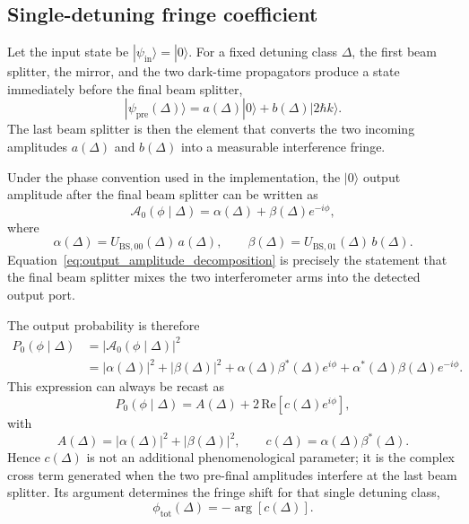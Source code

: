 \documentclass[11pt]{article}
\begin{document}
\subsection{Single-detuning fringe coefficient}
Let the input state be $|\psi_{\mathrm{in}}\rangle=|0\rangle$. For a fixed detuning class $\Delta$, the first beam splitter, the mirror, and the two dark-time propagators produce a state immediately before the final beam splitter,
\begin{equation}
|\psi_{\mathrm{pre}}(\Delta)\rangle
=
a(\Delta)|0\rangle+b(\Delta)|2\hbar k\rangle.
\label{eq:pre_final_state}
\end{equation}
The last beam splitter is then the element that converts the two incoming amplitudes $a(\Delta)$ and $b(\Delta)$ into a measurable interference fringe.

Under the phase convention used in the implementation, the $|0\rangle$ output amplitude after the final beam splitter can be written as
\begin{equation}
\mathcal{A}_0(\phi\mid\Delta)
=
\alpha(\Delta)+\beta(\Delta)e^{-i\phi},
\label{eq:output_amplitude_decomposition}
\end{equation}
where
\begin{equation}
\alpha(\Delta)=U_{\mathrm{BS},00}(\Delta)\,a(\Delta),
\qquad
\beta(\Delta)=U_{\mathrm{BS},01}(\Delta)\,b(\Delta).
\label{eq:alpha_beta_def}
\end{equation}
Equation~\eqref{eq:output_amplitude_decomposition} is precisely the statement that the final beam splitter mixes the two interferometer arms into the detected output port.

The output probability is therefore
\begin{align}
P_0(\phi\mid\Delta)
&=
\left|\mathcal{A}_0(\phi\mid\Delta)\right|^2 \\
&=
\left|\alpha(\Delta)\right|^2
+
\left|\beta(\Delta)\right|^2
+
\alpha(\Delta)\beta^*(\Delta)e^{i\phi}
+
\alpha^*(\Delta)\beta(\Delta)e^{-i\phi}.
\label{eq:expanded_output_probability}
\end{align}
This expression can always be recast as
\begin{equation}
P_0(\phi\mid\Delta)=A(\Delta)+2\,\mathrm{Re}\!\left[c(\Delta)e^{i\phi}\right],
\label{eq:single_detuning_fringe}
\end{equation}
with
\begin{equation}
A(\Delta)=\left|\alpha(\Delta)\right|^2+\left|\beta(\Delta)\right|^2,
\qquad
c(\Delta)=\alpha(\Delta)\beta^*(\Delta).
\label{eq:single_c_definition}
\end{equation}
Hence $c(\Delta)$ is not an additional phenomenological parameter; it is the complex cross term generated when the two pre-final amplitudes interfere at the last beam splitter. Its argument determines the fringe shift for that single detuning class,
\begin{equation}
\phi_{\mathrm{tot}}(\Delta)=-\arg\!\left[c(\Delta)\right].
\label{eq:single_class_phase}
\end{equation}
\end{document}
